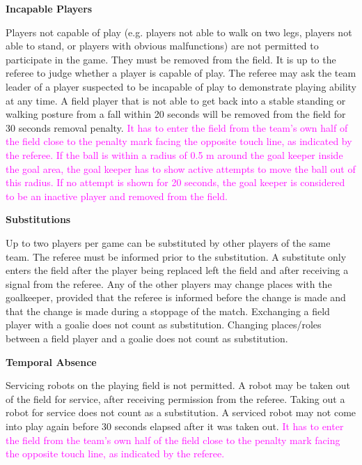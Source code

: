\bigskip

{\bfseries Incapable Players}

Players not capable of play (e.g. players not able to walk on two legs, players not able to stand, or players with obvious malfunctions) are not permitted to participate in the game. They must be removed from the field. It is up to the referee to judge whether a player is capable of play. The referee may ask the team leader of a player suspected to be incapable of play to demonstrate playing ability at any time. A field player that is not able to get back into a stable standing or walking posture from a fall within 20 seconds will be removed from the field for 30 seconds removal penalty. \textcolor{magenta}{It has to enter the field from the team's own half of the field close to the penalty mark facing the opposite touch line, as indicated by the referee. If the ball is within a radius of 0.5 m around the goal keeper inside the goal area, the goal keeper has to show active attempts to move the ball out of this radius. If no attempt is shown for 20 seconds, the goal keeper is considered to be an inactive player and removed from the field.}

\bigskip

{\bfseries Substitutions}

Up to two players per game can be substituted by other players of the same team. The referee must be informed prior to the substitution. A substitute only enters the field after the player being replaced left the field and after receiving a signal from the referee. Any of the
other players may change places with the goalkeeper, provided that the referee is informed before the change is made and that the change is made during a stoppage of the match. Exchanging a field player with a goalie does not count as substitution. Changing places/roles between a
field player and a goalie does not count as substitution.

\bigskip

{\bfseries Temporal Absence}

Servicing robots on the playing field is not permitted. A robot may be taken out of the field for service, after receiving permission from the referee. Taking out a robot for service does not count as a substitution. A serviced robot may not come into play again before 30 seconds elapsed after it was taken out. \textcolor{magenta}{It has to enter the field from the team's own half of the field close to the penalty mark facing the opposite touch line, as indicated by the referee.}

